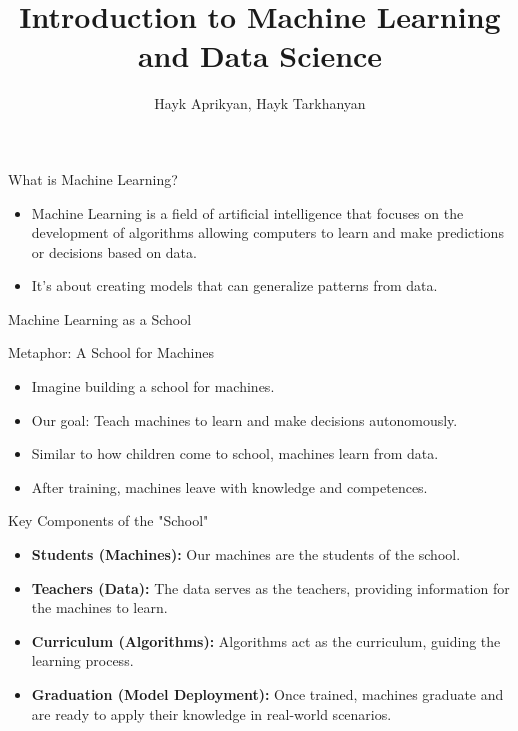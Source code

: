 \documentclass{beamer}
\title[Lecture 0]{Introduction to Machine Learning and Data Science}
\author[Aprikyan, Tarkhanyan]{Hayk Aprikyan, Hayk Tarkhanyan}
\begin{document}
\begin{frame}
  \titlepage
\end{frame}

\begin{frame}{What is Machine Learning?}
  \begin{itemize}[<+->]
    \item Machine Learning is a field of artificial intelligence that focuses on the development of algorithms allowing computers to learn and make predictions or decisions based on data.
    \item It's about creating models that can generalize patterns from data.
  \end{itemize}
\end{frame}

\begin{frame}{Machine Learning as a School}
  \begin{block}{Metaphor: A School for Machines}
    \begin{itemize}
      \item Imagine building a school for machines.
      \item Our goal: Teach machines to learn and make decisions autonomously.
      \item Similar to how children come to school, machines learn from data.
      \item After training, machines leave with knowledge and competences.
    \end{itemize}
  \end{block}
\end{frame}

\begin{frame}{Key Components of the "School"}
  \begin{itemize}
    \item \textbf{Students (Machines):} Our machines are the students of the school.
    \item \textbf{Teachers (Data):} The data serves as the teachers, providing information for the machines to learn.
    \item \textbf{Curriculum (Algorithms):} Algorithms act as the curriculum, guiding the learning process.
    \item \textbf{Graduation (Model Deployment):} Once trained, machines graduate and are ready to apply their knowledge in real-world scenarios.
  \end{itemize}
\end{frame}
\end{document}

